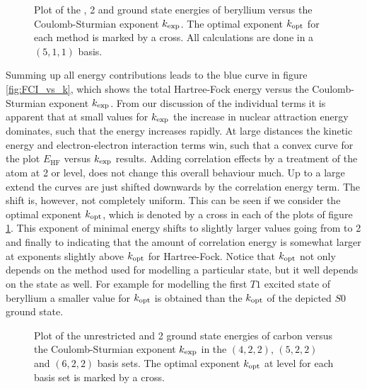 \begin{figure}
	\centering
	\caption[
		Plot of the \HF, {\MP}2 and \FCI energies
		versus the \CS exponent $\kexp$
	]{
		Plot of the \HF, {\MP}2 and \FCI ground state energies
		of beryllium
		versus the Coulomb-Sturmian exponent $\kexp$.
		The optimal exponent $k_\text{opt}$ for each
		method is marked by a cross.
		All calculations are done in a $(5,1,1)$ \CS basis.
	}
	\label{fig:FCI_vs_k}
\end{figure}
Summing up all energy contributions leads to the blue curve
in figure \vref{fig:FCI_vs_k},
which shows the total Hartree-Fock energy versus
the Coulomb-Sturmian exponent $\kexp$.
From our discussion of the individual terms
it is apparent that at small values for $\kexp$
the increase in nuclear attraction energy dominates,
such that the \HF energy increases rapidly.
At large distances the kinetic energy and electron-electron
interaction terms win, such that a convex curve
for the plot $E_\text{HF}$ versus $\kexp$ results.
Adding correlation effects by a treatment of the atom at {\MP}2 or \FCI level,
does not change this overall behaviour much.
Up to a large extend the curves are just shifted downwards by the
correlation energy term.
The shift is, however, not completely uniform.
This can be seen if we consider the optimal \CS exponent $k_\text{opt}$,
which is denoted by a cross in each of the plots of figure \ref{fig:FCI_vs_k}.
This exponent of minimal energy shifts
to slightly larger values going from \HF to {\MP}2 and finally to \FCI
indicating that the amount of correlation energy is somewhat larger
at exponents slightly above $k_\text{opt}$ for Hartree-Fock.
Notice that $k_\text{opt}$ not only depends on the method used for modelling
a particular state,
but it well depends on the state as well.
For example for modelling the first $T1$ excited state of beryllium
a smaller value for $k_\text{opt}$ is obtained than the \FCI $k_\text{opt}$
of the depicted $S0$ ground state.

\begin{figure}
	\centering
	\caption[
		Dependency of the \HF and {\MP}2 energies
		on the \CS exponent $\kexp$
		and the basis set
	]{
		Plot of the unrestricted
		\HF and {\MP}2 ground state energies of carbon
		versus the Coulomb-Sturmian exponent $\kexp$
		in the $(4,2,2)$, $(5,2,2)$ and $(6,2,2)$ basis sets.
		The optimal exponent $k_\text{opt}$ at \HF level
		for each basis set is marked by a cross.
	}
	\label{fig:EHF_vs_k}
\end{figure}

